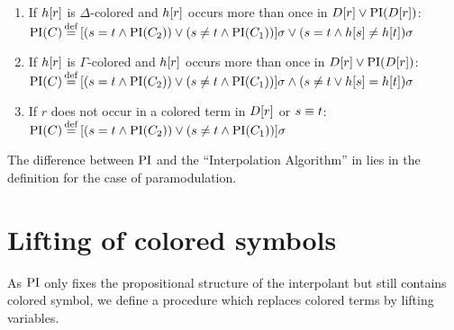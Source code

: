 \begin{defi}
\begin{itemize}
\begin{enumerate}
        \item If $h[r]$ is $\Delta$-colored and $h[r]$ occurs more than once in $D[r] \lor \operatorname{PI}(D[r])$:
          \label{def:PI_paramod_1}
          \newline
					$\operatorname{PI}(C) \operatorname{\stackrel{\mathrm{def}}{=}}{} [ ( s=t \land \operatorname{PI}(C_2) ) \lor (s\neq t \land \operatorname{PI}(C_1)) ]\sigma \lor (s=t \land h[s] \neq      h[t])\sigma$
        \item If $h[r]$ is $\Gamma$-colored and $h[r]$ occurs more than once in $D[r] \lor \operatorname{PI}(D[r])$:
          \label{def:PI_paramod_2}
          \newline
					$\operatorname{PI}(C) \operatorname{\stackrel{\mathrm{def}}{=}}{} [ ( s=t \land \operatorname{PI}(C_2) ) \lor (s\neq t \land \operatorname{PI}(C_1)) ]\sigma \land (s\neq t \lor h[s] =     h[t])\sigma$
				\item If $r$ does not occur in a colored term in $D[r]$ {\color{red} or $s\equiv t$}:
          \label{def:PI_paramod_3}
          \newline
					$\operatorname{PI}(C) \operatorname{\stackrel{\mathrm{def}}{=}}{} [ ( s=t \land \operatorname{PI}(C_2) ) \lor (s\neq t \land \operatorname{PI}(C_1)) ]\sigma$ \qedhere

      \end{enumerate}

  \end{itemize}
\end{defi}


The difference between $\operatorname{PI}$ and the ``Interpolation Algorithm'' in \cite{Huang95} lies in the definition for the case of paramodulation.
\mytodo{}


\section{Lifting of colored symbols}
As $\operatorname{PI}$ only fixes the propositional structure of the interpolant but still contains colored symbol, 
we define a procedure which replaces colored terms by lifting variables.


